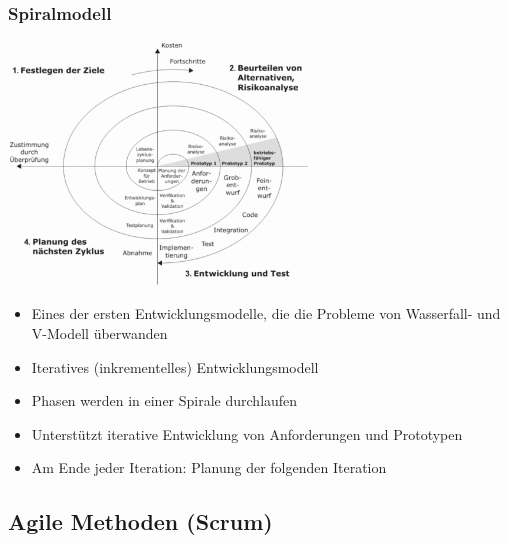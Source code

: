 \documentclass[11pt, a4paper]{article}
\begin{document}
\subsubsection{Spiralmodell}

\centering \includegraphics[width=0.6\textwidth]{Vorgehen-07.png} 

\raggedright

\begin{itemize}
    \item Eines der ersten Entwicklungsmodelle, die die Probleme von Wasserfall- und V-Modell überwanden
    \item Iteratives (inkrementelles) Entwicklungsmodell
    \item Phasen werden in einer Spirale durchlaufen
    \item Unterstützt iterative Entwicklung von Anforderungen und Prototypen
    \item Am Ende jeder Iteration: Planung der folgenden Iteration
\end{itemize}

\newpage



\subsection{Agile Methoden (Scrum)}
\end{document}
